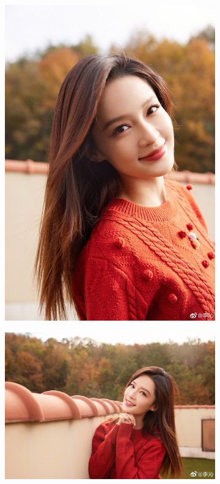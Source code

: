 \documentclass[a4paper]{article}
\begin{document}
\begin{figure}[H]
	\centering
	\begin{subfigure}{0.365\linewidth}
		\includegraphics[width=\linewidth]{images/lq1}
		\caption{}
	\end{subfigure}
	\begin{subfigure}{0.4\linewidth}
		\includegraphics[width=\linewidth]{images/lq2}

\end{subfigure}
\end{figure}
\end{document}
